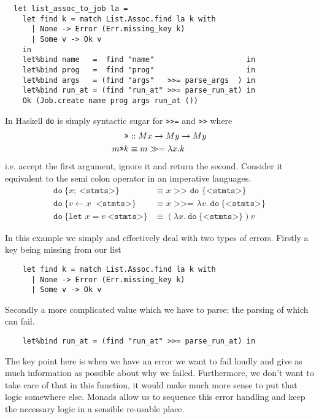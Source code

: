 \begin{verbatim}
  let list_assoc_to_job la =
    let find k = match List.Assoc.find la k with
      | None -> Error (Err.missing_key k)
      | Some v -> Ok v
    in
    let%bind name   =  find "name"                     in
    let%bind prog   =  find "prog"                     in
    let%bind args   = (find "args"   >>= parse_args  ) in
    let%bind run_at = (find "run_at" >>= parse_run_at) in
    Ok (Job.create name prog args run_at ())
\end{verbatim}
In Haskell \texttt{do} is simply syntactic sugar for \texttt{>>=} and \texttt{>>} where
\begin{align}
        \texttt{>>} &:: M x \rightarrow M y \rightarrow M y \\
    m \texttt{>>} k &\equiv m \gg= \lambda x.k
\end{align}
i.e. accept the first argument, ignore it and return the second.
Consider it equivalent to the semi colon operator in an imperative languages.
\begin{align}
    \texttt{do}\ \{ x;\ \texttt{<stmts>} \}
    &\equiv x \texttt{ >> do \{<stmts>\}}
    \\
    \texttt{do}\ \{ v \leftarrow x\ \texttt{ <stmts>}\}
    &\equiv x \texttt{ >>= } \lambda v.\ \texttt{do}\ \{ \texttt{<stmts>} \}
    \\
    \texttt{do}\ \{\texttt{let }x = v\ \texttt{<stmts>}\}
    &\equiv (\lambda x.\ \texttt{do}\ \{ \texttt{<stmts>} \})v
\end{align}

In this example we simply and effectively deal with two types of errors.
Firstly a key being missing from our list
\begin{verbatim}
    let find k = match List.Assoc.find la k with
      | None -> Error (Err.missing_key k)
      | Some v -> Ok v
\end{verbatim}
Secondly a more complicated value which we have to parse;
the parsing of which can fail.
\begin{verbatim}
    let%bind run_at = (find "run_at" >>= parse_run_at) in
\end{verbatim}
The key point here is when we have an error we want to fail
loudly and give as much information as possible about why we failed.
Furthermore, we don't want to take care of that in this function,
it would make much more sense to put that logic somewhere else.
Monads allow us to sequence this error handling
and keep the necessary logic in a sensible re-usable place.

